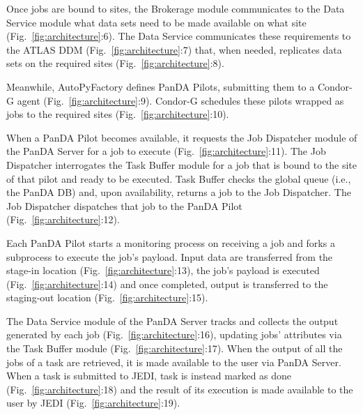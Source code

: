 Once jobs are bound to sites, the Brokerage module communicates to the Data
Service module what data sets need to be made available on what site
(Fig.~\ref{fig:architecture}:6). The Data Service communicates these
requirements to the ATLAS DDM (Fig.~\ref{fig:architecture}:7) that, when
needed, replicates data sets on the required sites
(Fig.~\ref{fig:architecture}:8).

Meanwhile, AutoPyFactory defines PanDA Pilots, submitting them to a Condor-G
agent (Fig.~\ref{fig:architecture}:9). Condor-G schedules these pilots
wrapped as jobs to the required sites (Fig.~\ref{fig:architecture}:10).

When a PanDA Pilot becomes available, it requests the Job Dispatcher module
of the PanDA Server for a job to execute (Fig.~\ref{fig:architecture}:11).
The Job Dispatcher interrogates the Task Buffer module for a job that is
bound to the site of that pilot and ready to be executed. Task Buffer checks
the global queue (i.e., the PanDA DB) and, upon availability, returns a job
to the Job Dispatcher. The Job Dispatcher dispatches that job to the PanDA
Pilot (Fig.~\ref{fig:architecture}:12).

Each PanDA Pilot starts a monitoring process on receiving a job and forks a
subprocess to execute the job's payload. Input data are transferred from the
stage-in location (Fig.~\ref{fig:architecture}:13), the job's payload is
executed (Fig.~\ref{fig:architecture}:14) and once completed, output is
transferred to the staging-out location (Fig.~\ref{fig:architecture}:15).

The Data Service module of the PanDA Server tracks and collects the output
generated by each job (Fig.~\ref{fig:architecture}:16), updating jobs'
attributes via the Task Buffer module (Fig.~\ref{fig:architecture}:17). When
the output of all the jobs of a task are retrieved, it is made available to
the user via PanDA Server. When a task is submitted to JEDI, task is instead
marked as done (Fig.~\ref{fig:architecture}:18) and the result of its
execution is made available to the user by JEDI
(Fig.~\ref{fig:architecture}:19).

